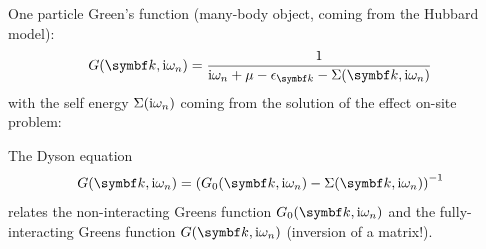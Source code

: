 \documentclass[../notes.tex]{subfiles}
\begin{document}
One particle Green's function (many-body object, coming from the Hubbard model):
\begin{equation}
	G(\vb{k}, \iu \omega_n) = \frac{1}{\iu \omega_n + \mu - \epsilon_{\vb{k}} - \Sigma(\vb{k}, \iu \omega_n)}
\end{equation}
with the self energy \(\Sigma(\mathrm{i} \omega_n)\) coming from the solution of the effect on-site problem:

The Dyson equation
\begin{equation}
	G(\vb{k}, \iu \omega_n) = \left( G_0 (\vb{k}, \iu \omega_n) - \Sigma(\vb{k}, \iu \omega_n)\right)^{-1}
\end{equation}
relates the non-interacting Greens function \(G_0 (\vb{k}, \iu \omega_n)\) and the fully-interacting Greens function \(G (\vb{k}, \iu \omega_n)\) (inversion of a matrix!).
\end{document}
